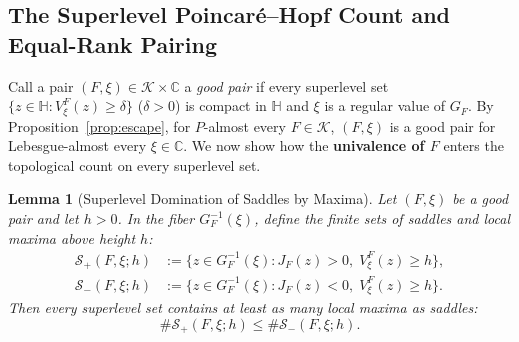 \documentclass[12pt]{article}
\def\C{\mathbb{C}}
\def\H{\mathbb{H}}
\def\K{\mathcal{K}}
\def\S{\mathcal{S}}
\newtheorem{lemma}[thm]{Lemma}
\theoremstyle{definition}
\numberwithin{equation}{section}
\begin{document}
\subsection{The Superlevel Poincar\'e--Hopf Count and Equal-Rank Pairing}

Call a pair $(F, \xi) \in \K \times \C$ a \emph{good pair} if every superlevel set $\{z \in \H : V_\xi^F(z) \ge \delta\}$ ($\delta > 0$) is compact in $\H$ and $\xi$ is a regular value of $G_F$. By Proposition~\ref{prop:escape}, for $P$-almost every $F \in \K$, $(F, \xi)$ is a good pair for Lebesgue-almost every $\xi \in \C$. We now show how the \textbf{univalence of $F$} enters the topological count on every superlevel set.

\begin{lemma}[Superlevel Domination of Saddles by Maxima]\label{lem:superlevel-count}
Let $(F, \xi)$ be a good pair and let $h > 0$. In the fiber $G_F^{-1}(\xi)$, define the finite sets of saddles and local maxima above height $h$:
\begin{equation}\label{eq:fiber-saddles-maxima}
\begin{aligned}
  \S_+(F, \xi; h) &:= \big\{z \in G_F^{-1}(\xi) : J_F(z) > 0,\; V_\xi^F(z) \ge h\big\}, \\
  \S_-(F, \xi; h) &:= \big\{z \in G_F^{-1}(\xi) : J_F(z) < 0,\; V_\xi^F(z) \ge h\big\}.
\end{aligned}
\end{equation}
Then every superlevel set contains at least as many local maxima as saddles:
\begin{equation}\label{eq:superlevel-ineq}
  \# \S_+(F, \xi; h) \le \# \S_-(F, \xi; h).
\end{equation}
\end{lemma}
\end{document}
